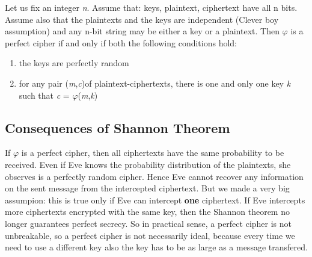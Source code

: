 Let us fix an integer \emph{n}. Assume that: keys, plaintext, ciphertext have all n bits. Assume also that the plaintexts and the keys are independent (Clever boy assumption) and any n-bit string may be either a key or a plaintext. Then $\varphi$ is a perfect cipher if and only if both the following conditions hold:
\begin{enumerate}
	\item the keys are perfectly random
	\item for any pair (\emph{m},\emph{c})of plaintext-ciphertexts, there is one and only one key \emph{k} such that \emph{c} = $\varphi$(\emph{m},\emph{k})
\end{enumerate}

\subsection{Consequences of Shannon Theorem}

If $\varphi$ is a perfect cipher, then all ciphertexts have the same probability to be received. Even if Eve knows the probability distribution of the plaintexts, she observes is a perfectly random cipher. Hence Eve cannot recover any information on the sent message from the intercepted ciphertext. But we made a very big assumpion: this is true only if Eve can intercept \textbf{one} ciphertext. If Eve intercepts more ciphertexts encrypted with the same key, then the Shannon theorem no longer guarantees perfect secrecy. So in practical sense, a perfect cipher is not unbreakable, so a perfect cipher is not necessarily ideal, because every time we need to use a different key also the key has to be as large as a message transfered.
